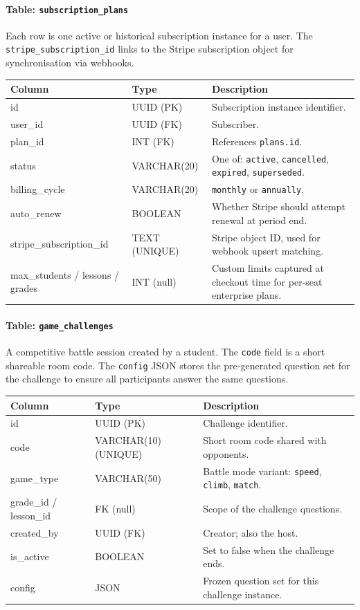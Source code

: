 \paragraph{Table: \texttt{subscription\_plans}}
Each row is one active or historical subscription instance for a user. The \texttt{stripe\_subscription\_id} links to the Stripe subscription object for synchronisation via webhooks.

\begin{longtable}{|p{4.5cm}|p{3cm}|p{6cm}|}
\hline \textbf{Column} & \textbf{Type} & \textbf{Description} \\ \hline
id & UUID (PK) & Subscription instance identifier. \\ \hline
user\_id & UUID (FK) & Subscriber. \\ \hline
plan\_id & INT (FK) & References \texttt{plans.id}. \\ \hline
status & VARCHAR(20) & One of: \texttt{active}, \texttt{cancelled}, \texttt{expired}, \texttt{superseded}. \\ \hline
billing\_cycle & VARCHAR(20) & \texttt{monthly} or \texttt{annually}. \\ \hline
auto\_renew & BOOLEAN & Whether Stripe should attempt renewal at period end. \\ \hline
stripe\_subscription\_id & TEXT (UNIQUE) & Stripe object ID, used for webhook upsert matching. \\ \hline
max\_students / lessons / grades & INT (null) & Custom limits captured at checkout time for per-seat enterprise plans. \\ \hline
\end{longtable}

\paragraph{Table: \texttt{game\_challenges}}
A competitive battle session created by a student. The \texttt{code} field is a short shareable room code. The \texttt{config} JSON stores the pre-generated question set for the challenge to ensure all participants answer the same questions.

\begin{longtable}{|p{4.2cm}|p{3cm}|p{6.8cm}|}
\hline \textbf{Column} & \textbf{Type} & \textbf{Description} \\ \hline
id & UUID (PK) & Challenge identifier. \\ \hline
code & VARCHAR(10) (UNIQUE) & Short room code shared with opponents. \\ \hline
game\_type & VARCHAR(50) & Battle mode variant: \texttt{speed}, \texttt{climb}, \texttt{match}. \\ \hline
grade\_id / lesson\_id & FK (null) & Scope of the challenge questions. \\ \hline
created\_by & UUID (FK) & Creator; also the host. \\ \hline
is\_active & BOOLEAN & Set to false when the challenge ends. \\ \hline
config & JSON & Frozen question set for this challenge instance. \\ \hline
\end{longtable}

